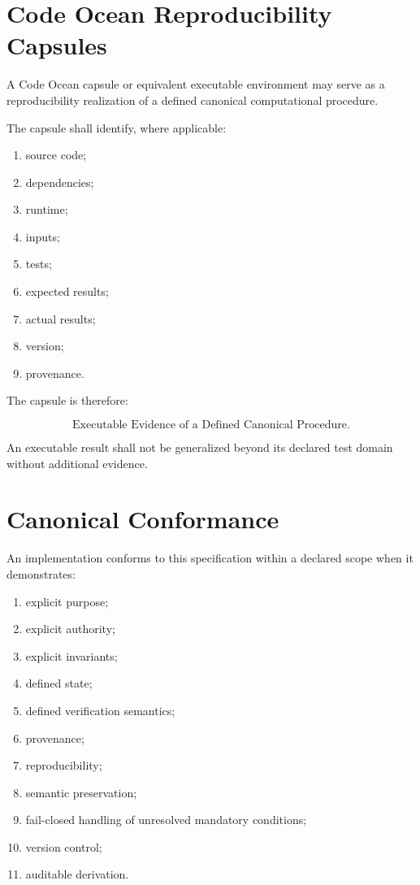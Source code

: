\documentclass[11pt]{article}
\begin{document}
\section{Code Ocean Reproducibility Capsules}

A Code Ocean capsule or equivalent executable environment may
serve as a reproducibility realization of a defined canonical
computational procedure.

The capsule shall identify, where applicable:

\begin{enumerate}
    \item source code;
    \item dependencies;
    \item runtime;
    \item inputs;
    \item tests;
    \item expected results;
    \item actual results;
    \item version;
    \item provenance.
\end{enumerate}

The capsule is therefore:

\[
\boxed{
\text{Executable Evidence of a Defined Canonical Procedure}.
}
\]

An executable result shall not be generalized beyond its declared
test domain without additional evidence.

\section{Canonical Conformance}

An implementation conforms to this specification within a
declared scope when it demonstrates:

\begin{enumerate}
    \item explicit purpose;
    \item explicit authority;
    \item explicit invariants;
    \item defined state;
    \item defined verification semantics;
    \item provenance;
    \item reproducibility;
    \item semantic preservation;
    \item fail-closed handling of unresolved mandatory conditions;
    \item version control;
    \item auditable derivation.
\end{enumerate}
\end{document}
